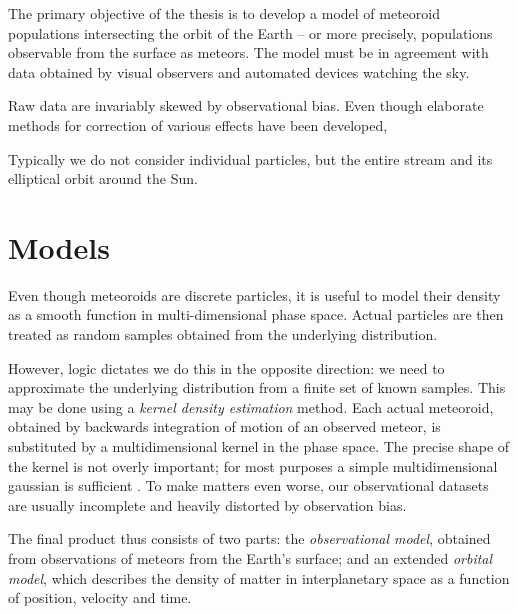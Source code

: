 
The primary objective of the thesis is to develop a model of meteoroid populations intersecting
the orbit of the Earth -- or more precisely, populations observable from the surface as meteors.
The model must be in agreement with data obtained by visual observers and automated devices watching the sky.

Raw data are invariably skewed by observational bias. Even though elaborate methods for correction of various
effects have been developed,


Typically we do not consider individual particles, but the entire stream and its elliptical orbit around the Sun.

\section{Models}
    Even though meteoroids are discrete particles, it is useful to model their density
    as a smooth function in multi-dimensional phase space.
    Actual particles are then treated as random samples obtained from the underlying distribution.

    However, logic dictates we do this in the opposite direction: we need to approximate
    the underlying distribution from a finite set of known samples.
    This may be done using a \emph{kernel density estimation} method.
    Each actual meteoroid, obtained by backwards integration of motion of an observed meteor,
    is substituted by a multidimensional kernel in the phase space. The precise shape of the kernel
    is not overly important; for most purposes a simple multidimensional gaussian is sufficient \cite{???}.
    To make matters even worse, our observational datasets are usually incomplete
    and heavily distorted by observation bias.

    The final product thus consists of two parts: the \emph{observational model},
    obtained from observations of meteors from the Earth's surface;
    and an extended \emph{orbital model}, which describes the density of matter
    in interplanetary space as a function of position, velocity and time.

